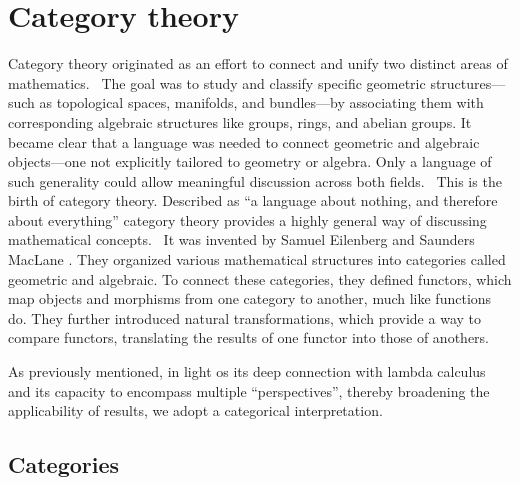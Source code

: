 \section{Category theory} \label{sec:catgories}


Category theory originated as an effort to connect and unify two distinct areas of mathematics.  The goal was to study and classify specific geometric structures—such as topological spaces, manifolds, and bundles—by associating them with corresponding algebraic structures like groups, rings, and abelian groups. It became clear that a language was needed to connect geometric and algebraic objects—one not explicitly tailored to geometry or algebra. Only a language of such generality could allow meaningful discussion across both fields.  This is the birth of category theory.
Described as ``a language about nothing, and therefore about everything'' category theory provides a highly general way of discussing mathematical concepts.  It was invented by Samuel Eilenberg and Saunders MacLane \cite{eilenbergGeneralTheoryNatural1945}. They organized various mathematical structures into categories called geometric and algebraic. To connect these categories, they defined functors, which map objects and morphisms from one category to another, much like functions do. They further introduced natural transformations, which provide a way to compare functors, translating the results of one functor into those of anothers. \cite{yanofskyMonoidalCategoryTheory2024}

 As previously mentioned, in light os its deep connection with lambda calculus and its capacity to encompass multiple ``perspectives'', thereby broadening the applicability of results, we adopt a categorical interpretation.



\subsection{Categories}

